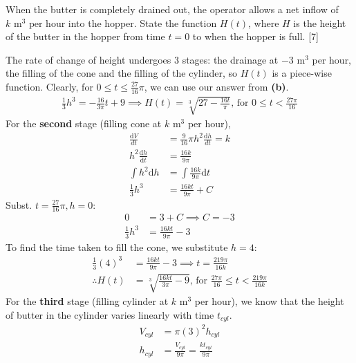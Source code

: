 \documentclass[12pt, a4 paper]{article}
\begin{document}
\begin{outline}[enumerate]
 \2 When the butter is completely drained out, the operator allows a net inflow of \(k\textrm{ m}^3{\textrm{ per hour}}\) into the hopper. State the function \(H(t)\), where \(H\) is the height of the butter in the hopper from time \(t=0\) to when the hopper is full. \hfill[7]
 \begin{answer}
  The rate of change of height undergoes 3 stages: the drainage at \(-\)3 m\(^3\) per hour, the filling of the cone and the filling of the cylinder, so \(H(t)\) is a piece-wise function. Clearly, for \(0 \leq t \leq \frac{27}{16}\pi\), we can use our answer from \textbf{(b)}.
  \begin{align*}
   \frac{1}{3}h^3 = -\frac{16}{3\pi}t + 9 \implies H(t)=\sqrt[3]{27-\frac{16t}{\pi}} \textrm{, for }0 \leq t < \frac{27\pi}{16}
  \end{align*}
  For the \textbf{second} stage (filling cone at \(k\) m\(^3\) per hour),
  \begin{align*}
   \frac{\mathrm{d}V}{{d}t}                     & = \frac{9}{16}\pi h^2\frac{\mathrm{d}h}{{d}t} = k \\
   {h^2}\frac{{{\mathrm{d}}h}}{{{\mathrm{d}}t}} & = \frac{{16k}}{{9\pi }}                           \\
   \int {h^2}\mathrm{d}h                        & = \int \frac{16k}{9\pi} \mathrm{d}t               \\
   \frac{1}{3}h^3                               & = \frac{16kt}{9\pi}+C
  \end{align*}
  Subst. \(t=\frac{27}{16}\pi,h=0\):
  \begin{align*}
   0              & = 3+C \implies C=-3   \\
   \frac{1}{3}h^3 & = \frac{16kt}{9\pi}-3
  \end{align*}
  To find the time taken to fill the cone, we substitute \(h=4\):
  \begin{align*}
   \frac{1}{3}(4)^3 & = \frac{16kt}{9\pi}-3 \implies t=\frac{219\pi}{16k}                                        \\
   \therefore H(t)  & =\sqrt[3]{\frac{16kt}{3\pi}-9} \textrm{, for }\frac{27\pi}{16} \leq t < \frac{219\pi}{16k}
  \end{align*}
  For the \textbf{third} stage (filling cylinder at \(k\) m\(^3\) per hour), we know that the height of butter in the cylinder varies linearly with time \(t_{cyl}\).
  \begin{align*}
   V_{cyl} & =\pi(3)^2h_{cyl}                               \\
   h_{cyl} & = \frac{V_{cyl}}{9\pi} = \frac{kt_{cyl}}{9\pi}

\end{align*}
\end{answer}
\end{outline}
\end{document}
